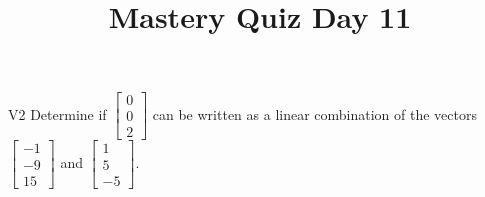 \documentclass{sbgLAquiz}
\title{Mastery Quiz Day 11 }
\begin{document}
\begin{problem}{V2}
Determine if  $\begin{bmatrix} 0 \\ 0 \\ 2 \end{bmatrix}$ can be written as a linear combination of the vectors $\begin{bmatrix} -1 \\ -9 \\ 15 \end{bmatrix}$ and $\begin{bmatrix} 1 \\ 5 \\ -5 \end{bmatrix}$.
\end{problem}
\end{document}
